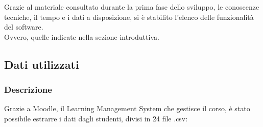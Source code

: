 Grazie al materiale consultato durante la prima fase dello sviluppo, le conoscenze tecniche, il tempo e i dati a disposizione, si è stabilito l'elenco delle funzionalità del software. \\
Ovvero, quelle indicate nella sezione introduttiva.

\subsection{Dati utilizzati}

\subsubsection{Descrizione}

Grazie a Moodle, il Learning Management System che gestisce il corso, è stato possibile estrarre i dati dagli studenti, divisi in 24 file .csv:

